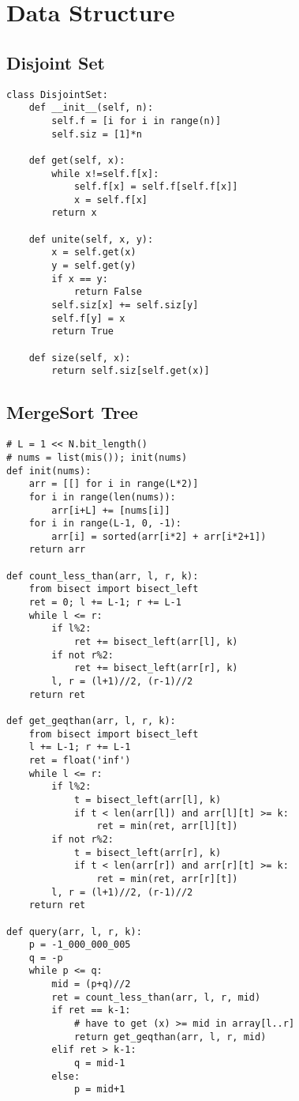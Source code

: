 \documentclass[landscape, 8pt, a4paper, oneside, twocolumn]{extarticle}
\begin{document}
\section{Data Structure}
\subsection{Disjoint Set}
\begin{verbatim}
class DisjointSet:
    def __init__(self, n):
        self.f = [i for i in range(n)]
        self.siz = [1]*n

    def get(self, x):
        while x!=self.f[x]:
            self.f[x] = self.f[self.f[x]]
            x = self.f[x]
        return x

    def unite(self, x, y):
        x = self.get(x)
        y = self.get(y)
        if x == y:
            return False
        self.siz[x] += self.siz[y]
        self.f[y] = x
        return True

    def size(self, x):
        return self.siz[self.get(x)]

\end{verbatim}
\subsection{MergeSort Tree}
\begin{verbatim}
# L = 1 << N.bit_length()
# nums = list(mis()); init(nums)
def init(nums):
    arr = [[] for i in range(L*2)]
    for i in range(len(nums)):
        arr[i+L] += [nums[i]]
    for i in range(L-1, 0, -1):
        arr[i] = sorted(arr[i*2] + arr[i*2+1])
    return arr

def count_less_than(arr, l, r, k):
    from bisect import bisect_left
    ret = 0; l += L-1; r += L-1
    while l <= r:
        if l%2:
            ret += bisect_left(arr[l], k)
        if not r%2:
            ret += bisect_left(arr[r], k)
        l, r = (l+1)//2, (r-1)//2
    return ret

def get_geqthan(arr, l, r, k):
    from bisect import bisect_left
    l += L-1; r += L-1
    ret = float('inf')
    while l <= r:
        if l%2:
            t = bisect_left(arr[l], k)
            if t < len(arr[l]) and arr[l][t] >= k:
                ret = min(ret, arr[l][t])
        if not r%2:
            t = bisect_left(arr[r], k)
            if t < len(arr[r]) and arr[r][t] >= k:
                ret = min(ret, arr[r][t])
        l, r = (l+1)//2, (r-1)//2
    return ret

def query(arr, l, r, k):
    p = -1_000_000_005
    q = -p
    while p <= q:
        mid = (p+q)//2
        ret = count_less_than(arr, l, r, mid)
        if ret == k-1:
            # have to get (x) >= mid in array[l..r]
            return get_geqthan(arr, l, r, mid)
        elif ret > k-1:
            q = mid-1
        else:
            p = mid+1
\end{verbatim}
\end{document}
